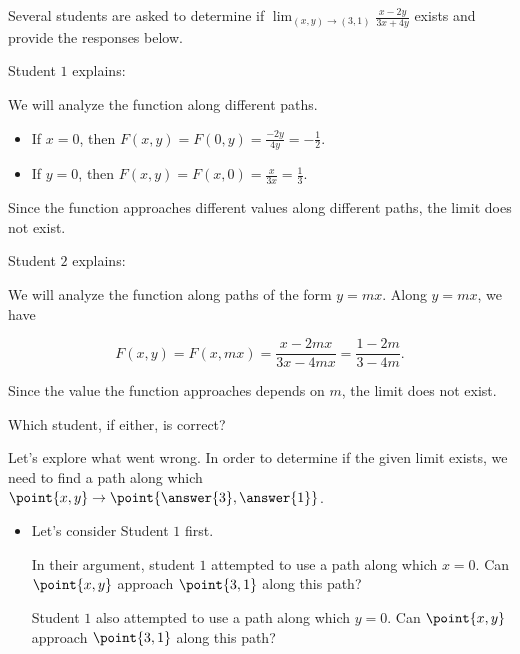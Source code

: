 \documentclass{ximera}
\author{Jim Talamo}
\begin{document}
\begin{exercise}

Several students are asked to determine if $\lim_{(x,y) \to (3,1)} \frac{x-2y}{3x+4y}$ exists and provide the responses below.

Student $1$ explains:


We will analyze the function along different paths.

\begin{itemize}
\item If $x=0$, then $F(x,y) = F(0,y) = \frac{-2y}{4y} = -\frac{1}{2}$.
\item If $y=0$, then $F(x,y) = F(x,0) = \frac{x}{3x} = \frac{1}{3}$.
\end{itemize}

Since the function approaches different values along different paths, the limit does not exist.


Student $2$ explains:


We will analyze the function along paths of the form $y=mx$.  Along $y=mx$, we have

\[
F(x,y)=F(x,mx) = \frac{x-2mx}{3x-4mx} = \frac{1-2m}{3-4m}.
\]

Since the value the function approaches depends on $m$, the limit does not exist.


Which student, if either, is correct?

\begin{multipleChoice}
\end{multipleChoice}

\begin{exercise}
Let's explore what went wrong.  In order to determine if the given limit exists, we need to find a path along which $\point{x,y} \to \point{\answer{3},\answer{1}}$.

\begin{itemize}
\item Let's consider Student $1$ first.

In their argument, student $1$ attempted to use a path along which $x=0$.  Can $\point{x,y}$ approach $\point{3,1}$ along this path? 

Student $1$ also attempted to use a path along which $y=0$.  Can $\point{x,y}$ approach $\point{3,1}$ along this path? 


\end{itemize}
\end{exercise}
\end{exercise}
\end{document}
